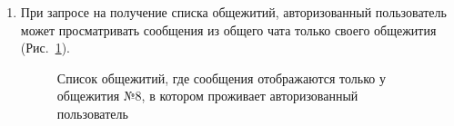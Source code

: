 \documentclass{../includes/TechDoc}
\begin{document}
\begin{enumerate}
        \item При запросе на получение списка общежитий, авторизованный пользователь может просматривать
        сообщения из общего чата только своего общежития (Рис.~\ref{ris:api_dormitory_messages}).
        \begin{figure}[ht]
            \centering
            \caption{Список общежитий, где сообщения отображаются только у общежития №8, в котором проживает авторизованный пользователь}
            \label{ris:api_dormitory_messages}
        \end{figure}


\end{enumerate}
\end{document}
